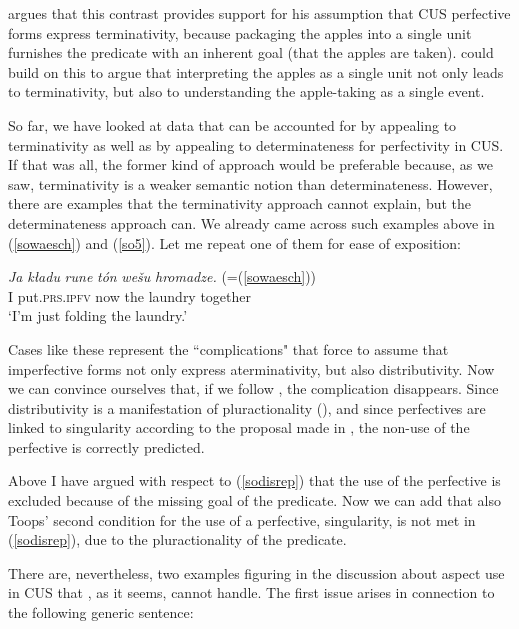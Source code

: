 \documentclass[output=paper,colorlinks,citecolor=brown]{langscibook}
\begin{document}
\citet{Breu2000} argues that this contrast provides support for his assumption that CUS perfective forms express terminativity, because packaging the apples into a single unit furnishes the predicate with an inherent goal (that the apples are taken). \citet{Toops2001} could build on this to argue that interpreting the apples as a single unit not only leads to terminativity, but also to understanding the apple-taking as a single event. 

So far, we have looked at data that can be accounted for by appealing to terminativity as well as by appealing to determinateness for perfectivity in CUS. If that was all, the former kind of approach would be preferable because, as we saw, terminativity is a weaker semantic notion than determinateness. However, there are examples that the terminativity approach 
cannot explain, but the determinateness approach can. We already came across such examples above in (\ref{sowaesch}) and (\ref{so5}). Let me repeat one of them for ease of exposition:  

  \ea\label{sowaeschrep}
\gll \textit{Ja} \textit{k\l{a}du} \textit{rune} \textit{t\'on} \textit{wešu}
\textit{hromadze.} (=(\ref{sowaesch}))\\
I put.\textsc{prs.ipfv} now the laundry together\\
\glt \normalsize{`I'm just folding the laundry.'}
\z

\noindent Cases like these represent the ``complications" that force \citet{Breu2000} to assume that imperfective forms not only express aterminativity, but also distributivity. Now we can convince ourselves that, if we follow \citet{Toops2001}, the complication disappears. Since distributivity is a manifestation of pluractionality (\citealt{anamuller20}), and since perfectives are linked to singularity according to the proposal made in \citet{Toops2001}, the non-use of the perfective is correctly predicted. 

Above I have argued with respect to (\ref{sodisrep}) that the use of the perfective is excluded because of the missing goal of the predicate. Now we can add that also Toops' second condition for the use of a perfective, singularity, is not met in (\ref{sodisrep}), due to the pluractionality of the predicate.  


There are, nevertheless, two examples figuring in the discussion about aspect use in CUS that 
\citet{Toops2001}, as it seems, cannot handle. 
The first issue arises in connection to the following generic sentence:
\end{document}
